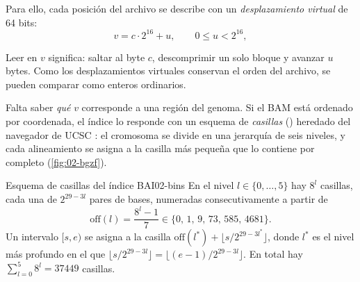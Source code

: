 Para ello, cada posición del archivo se describe con un \emph{desplazamiento virtual} de 64 bits:
\begin{equation}\label{eq:02-voffset}
v = c \cdot 2^{16} + u, \qquad 0 \le u < 2^{16},
\end{equation}
\begin{simbolos}
\end{simbolos}
Leer en $v$ significa: saltar al byte $c$, descomprimir un solo bloque y avanzar $u$ bytes. Como los desplazamientos virtuales conservan el orden del archivo, se pueden comparar como enteros ordinarios.

Falta saber \emph{qué} $v$ corresponde a una región del genoma. Si el BAM está ordenado por coordenada, el índice  lo responde con un esquema de \emph{casillas} () heredado del navegador de UCSC \parencite{c02-kent2002}: el cromosoma se divide en una jerarquía de seis niveles, y cada alineamiento se asigna a la casilla más pequeña que lo contiene por completo (\cref{fig:02-bgzf}).

\begin{teorema}{Esquema de casillas del índice BAI}{02-bins}
En el nivel $l\in\{0,\dots,5\}$ hay $8^l$ casillas, cada una de $2^{29-3l}$ pares de bases, numeradas consecutivamente a partir de
\begin{equation}\label{eq:02-bin}
\mathrm{off}(l) = \frac{8^l-1}{7} \in \{0,\,1,\,9,\,73,\,585,\,4681\}.
\end{equation}
Un intervalo $[s,e)$ se asigna a la casilla $\mathrm{off}(l^*) + \lfloor s/2^{29-3l^*}\rfloor$, donde $l^*$ es el nivel más profundo en el que $\lfloor s/2^{29-3l}\rfloor = \lfloor (e-1)/2^{29-3l}\rfloor$. En total hay $\sum_{l=0}^{5}8^l = \num{37449}$ casillas.
\end{teorema}
\begin{simbolos}
\simbolo{$[s,e)$}{Intervalo 0-based semiabierto que ocupa el alineamiento.}
\end{simbolos}

